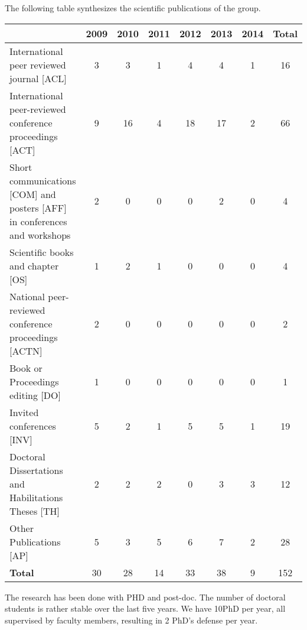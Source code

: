 



The following table synthesizes the scientific publications of the group.

\begin{center}\begin{tabular}{|p{6cm}|*{7}{c|}}
\hline
~ &2009 &2010 &2011 &2012 &2013 &2014 & \textbf{Total} \\
\hline
International peer reviewed journal [ACL] & 3  & 3  & 1  & 4  & 4  & 1  & 16 \\
\hline
International peer-reviewed conference proceedings [ACT] & 9  & 16  & 4  & 18  & 17  & 2  & 66 \\
\hline
Short communications [COM] and posters [AFF] in conferences and workshops & 2  & 0  & 0  & 0  & 2  & 0  & 4 \\
\hline
Scientific books and chapter [OS] & 1  & 2  & 1  & 0  & 0  & 0  & 4 \\
\hline
National peer-reviewed conference proceedings [ACTN] & 2  & 0  & 0  & 0  & 0  & 0  & 2 \\
\hline
Book or Proceedings editing [DO] & 1  & 0  & 0  & 0  & 0  & 0  & 1 \\
\hline
Invited conferences [INV] & 5  & 2  & 1  & 5  & 5  & 1  & 19 \\
\hline
Doctoral Dissertations and Habilitations Theses [TH] & 2  & 2  & 2  & 0  & 3  & 3  & 12 \\
\hline
Other Publications [AP] & 5  & 3  & 5  & 6  & 7  & 2  & 28 \\
\hline \textbf{Total} &30&28&14&33&38&9&152\\\hline
\end{tabular}\end{center}
\makeatother


The research has been done with PHD and post-doc. The  number of doctoral students is rather stable over the last five years. We have 10PhD per year, all supervised by faculty members, resulting in 2 PhD's defense per year. 

